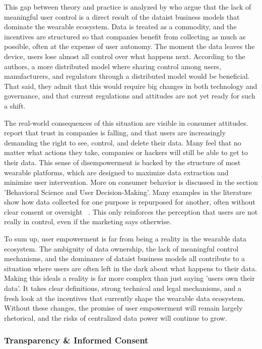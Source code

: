 	This gap between theory and practice is analyzed by \cite{Conradie2022} who argue that the lack of meaningful user control is a direct result of the dataist business models that dominate the wearable ecosystem. Data is treated as a commodity, and the incentives are structured so that companies benefit from collecting as much as possible, often at the expense of user autonomy. The moment the data leaves the device, users lose almost all control over what happens next. According to the authors, a more distributed model where sharing control among users, manufacturers, and regulators through a distributed model would be beneficial. That said, they admit that this would require big changes in both technology and governance, and that current regulations and attitudes are not yet ready for such a shift.

	The real-world consequences of this situation are visible in consumer attitudes. \cite{Arbanas2023} report that trust in companies is falling, and that users are increasingly demanding the right to see, control, and delete their data. Many feel that no matter what actions they take, companies or hackers will still be able to get to their data. This sense of disempowerment is backed by the structure of most wearable platforms, which are designed to maximize data extraction and minimize user intervention. More on consumer behavior is discussed in the section 'Behavioral Science and User Decision-Making'. Many examples in the literature show how data collected for one purpose is repurposed for another, often without clear consent or oversight ~\cite{Sui2023}. This only reinforces the perception that users are not really in control, even if the marketing says otherwise.

	To sum up, user empowerment is far from being a reality in the wearable data ecosystem. The ambiguity of data ownership, the lack of meaningful control mechanisms, and the dominance of dataist business models all contribute to a situation where users are often left in the dark about what happens to their data. Making this ideals a reality is far more complex than just saying 'users own their data'. It takes clear definitions, strong technical and legal mechanisms, and a fresh look at the incentives that currently shape the wearable data ecosystem. Without these changes, the promise of user empowerment will remain largely rhetorical, and the risks of centralized data power will continue to grow.
	\subsubsection{Transparency \& Informed Consent}

